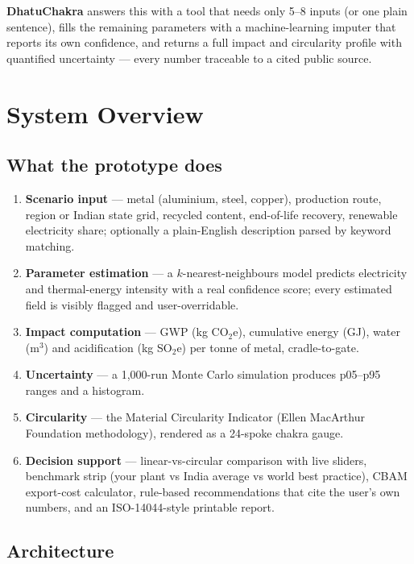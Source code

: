 \documentclass[11pt,a4paper]{article}
\begin{document}
\textbf{DhatuChakra} answers this with a tool that needs only 5--8 inputs (or one plain
sentence), fills the remaining parameters with a machine-learning imputer that reports its
own confidence, and returns a full impact and circularity profile with quantified
uncertainty --- every number traceable to a cited public source.

\section{System Overview}

\subsection{What the prototype does}
\begin{enumerate}[leftmargin=1.6em, itemsep=1pt]
  \item \textbf{Scenario input} --- metal (aluminium, steel, copper), production route,
        region or Indian state grid, recycled content, end-of-life recovery, renewable
        electricity share; optionally a plain-English description parsed by keyword matching.
  \item \textbf{Parameter estimation} --- a $k$-nearest-neighbours model predicts electricity
        and thermal-energy intensity with a real confidence score; every estimated field is
        visibly flagged and user-overridable.
  \item \textbf{Impact computation} --- GWP (kg CO$_2$e), cumulative energy (GJ), water
        (m$^3$) and acidification (kg SO$_2$e) per tonne of metal, cradle-to-gate.
  \item \textbf{Uncertainty} --- a 1{,}000-run Monte Carlo simulation produces p05--p95
        ranges and a histogram.
  \item \textbf{Circularity} --- the Material Circularity Indicator (Ellen MacArthur
        Foundation methodology), rendered as a 24-spoke chakra gauge.
  \item \textbf{Decision support} --- linear-vs-circular comparison with live sliders,
        benchmark strip (your plant vs India average vs world best practice), CBAM
        export-cost calculator, rule-based recommendations that cite the user's own numbers,
        and an ISO-14044-style printable report.
\end{enumerate}

\subsection{Architecture}
\end{document}
